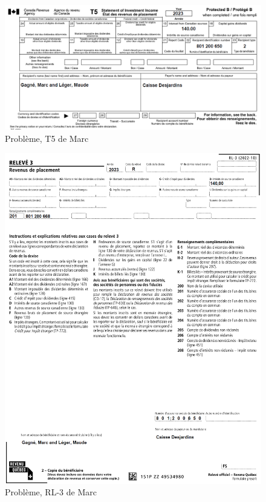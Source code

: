 \begin{figure}
	\centering
	\includegraphics[width=.9\textwidth]{probleme/chapitre-6/Marc-T5.png}
	\caption[]{Problème, T5 de Marc}
	\label{fig:chap6ProblemeMarcT5}
\end{figure}
\begin{figure}
	\centering
	\includegraphics[width=.9\textwidth]{probleme/chapitre-6/Marc-RL3.png}
	\caption[]{Problème, RL-3 de Marc}
	\label{fig:chap6ProblemeMarcRL3}
\end{figure}
